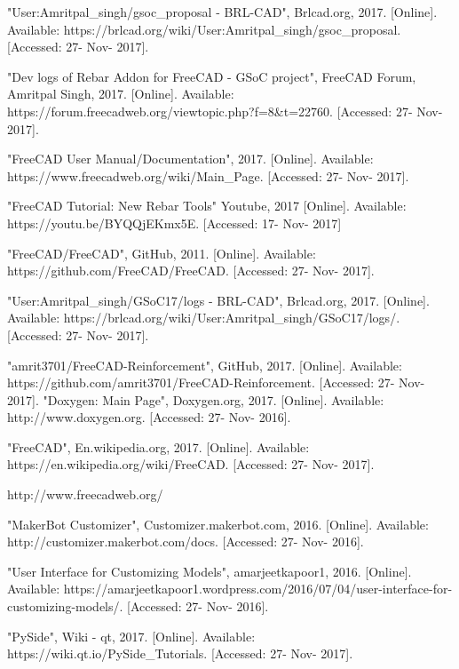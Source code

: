  
\begin{thebibliography}{22}



\bibitem{} "User:Amritpal\_singh/gsoc\_proposal - BRL-CAD", Brlcad.org, 2017. [Online]. Available: https://brlcad.org/wiki/User:Amritpal\_singh/gsoc\_proposal. [Accessed: 27- Nov- 2017].

\bibitem{} "Dev logs of Rebar Addon for FreeCAD - GSoC project", FreeCAD Forum, Amritpal Singh, 2017. [Online]. Available: https://forum.freecadweb.org/viewtopic.php?f=8\&t=22760. [Accessed: 27- Nov- 2017].

\bibitem{} "FreeCAD User Manual/Documentation", 2017. [Online]. Available: https://www.freecadweb.org/wiki/Main\_Page. [Accessed: 27- Nov- 2017].

\bibitem{} "FreeCAD Tutorial: New Rebar Tools" Youtube, 2017 [Online]. Available: https://youtu.be/BYQQjEKmx5E. [Accessed: 17- Nov- 2017]

\bibitem{} "FreeCAD/FreeCAD", GitHub, 2011. [Online]. Available: https://github.com/FreeCAD/FreeCAD. [Accessed: 27- Nov- 2017].

\bibitem{} "User:Amritpal\_singh/GSoC17/logs - BRL-CAD", Brlcad.org, 2017. [Online]. Available: https://brlcad.org/wiki/User:Amritpal\_singh/GSoC17/logs/. [Accessed: 27- Nov- 2017].

\bibitem{} "amrit3701/FreeCAD-Reinforcement", GitHub, 2017. [Online]. Available: https://github.com/amrit3701/FreeCAD-Reinforcement. [Accessed: 27- Nov- 2017].
\bibitem{} "Doxygen: Main Page", Doxygen.org, 2017. [Online]. Available: http://www.doxygen.org. [Accessed: 27- Nov- 2016].

\bibitem{} "FreeCAD", En.wikipedia.org, 2017. [Online]. Available: https://en.wikipedia.org/wiki/FreeCAD. [Accessed: 27- Nov- 2017].

\bibitem{} http://www.freecadweb.org/

\bibitem{} "MakerBot Customizer", Customizer.makerbot.com, 2016. [Online]. Available: http://customizer.makerbot.com/docs. [Accessed: 27- Nov- 2016].

\bibitem{} "User Interface for Customizing Models", amarjeetkapoor1, 2016. [Online]. Available: https://amarjeetkapoor1.wordpress.com/2016/07/04/user-interface-for-customizing-models/. [Accessed: 27- Nov- 2016].

\bibitem{} "PySide", Wiki - qt, 2017. [Online]. Available: https://wiki.qt.io/PySide\_Tutorials. [Accessed: 27- Nov- 2017].


\end{thebibliography}
